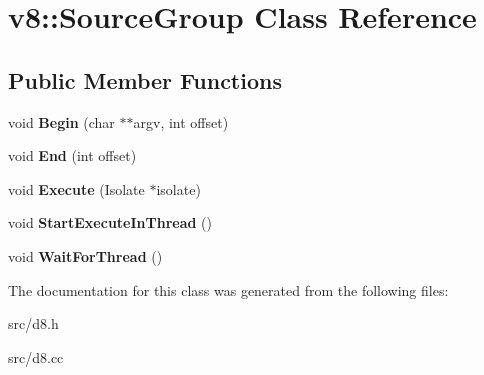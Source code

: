 \hypertarget{classv8_1_1_source_group}{}\section{v8\+:\+:Source\+Group Class Reference}
\label{classv8_1_1_source_group}
\subsection*{Public Member Functions}
\begin{DoxyCompactItemize}
\item 
\hypertarget{classv8_1_1_source_group_a1a4522bd45001d3ee6d4b31547e78783}{}void {\bfseries Begin} (char $\ast$$\ast$argv, int offset)\label{classv8_1_1_source_group_a1a4522bd45001d3ee6d4b31547e78783}

\item 
\hypertarget{classv8_1_1_source_group_a6381d03bcd46b18c3099c3b56a86abae}{}void {\bfseries End} (int offset)\label{classv8_1_1_source_group_a6381d03bcd46b18c3099c3b56a86abae}

\item 
\hypertarget{classv8_1_1_source_group_a4d63b7ea2799affcb6df9922535db149}{}void {\bfseries Execute} (Isolate $\ast$isolate)\label{classv8_1_1_source_group_a4d63b7ea2799affcb6df9922535db149}

\item 
\hypertarget{classv8_1_1_source_group_a6e6a61155ca7c4553a363ce22e755eae}{}void {\bfseries Start\+Execute\+In\+Thread} ()\label{classv8_1_1_source_group_a6e6a61155ca7c4553a363ce22e755eae}

\item 
\hypertarget{classv8_1_1_source_group_ab30c676f1939def5c34fa8640ba96172}{}void {\bfseries Wait\+For\+Thread} ()\label{classv8_1_1_source_group_ab30c676f1939def5c34fa8640ba96172}

\end{DoxyCompactItemize}


The documentation for this class was generated from the following files\+:\begin{DoxyCompactItemize}
\item 
src/d8.\+h\item 
src/d8.\+cc\end{DoxyCompactItemize}
